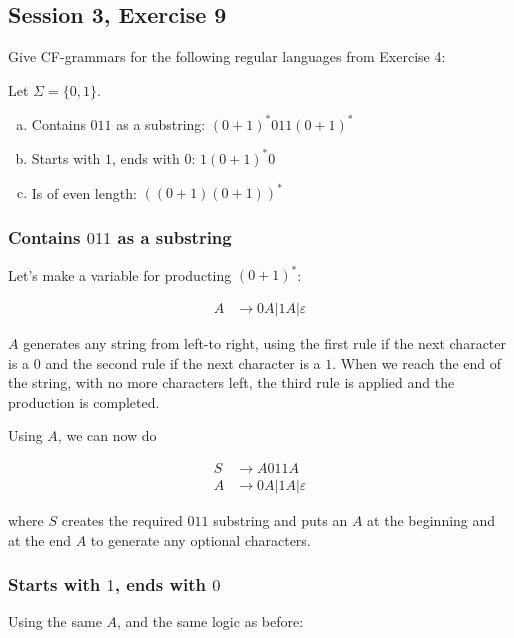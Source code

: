 \subsection{Session 3, Exercise 9}


Give CF-grammars for the following regular languages from Exercise 4:

Let $\Sigma=\{0,1\}$.

\begin{enumerate}[a.)]
\item Contains $011$ as a substring: $(0+1)^*011(0+1)^*$
\item Starts with $1$, ends with $0$: $1(0+1)^*0$
\item Is of even length: $((0+1)(0+1))^*$
\end{enumerate}


\subsubsection{Contains $011$ as a substring}

Let's make a variable for producting $(0+1)^*$:

\begin{align*}
A &\rightarrow 0A|1A|\varepsilon
\end{align*}

$A$ generates any string from left-to right, using the first rule if the next character is a $0$ and the second rule if the next character is a $1$. When we reach the end of the string, with no more characters left, the third rule is applied and the production is completed.

Using $A$, we can now do

\begin{align*}
S &\rightarrow A011A\\
A &\rightarrow 0A|1A|\varepsilon
\end{align*}

where $S$ creates the required $011$ substring and puts an $A$ at the beginning and at the end $A$ to generate any optional characters.

\subsubsection{Starts with $1$, ends with $0$}

Using the same $A$, and the same logic as before:

